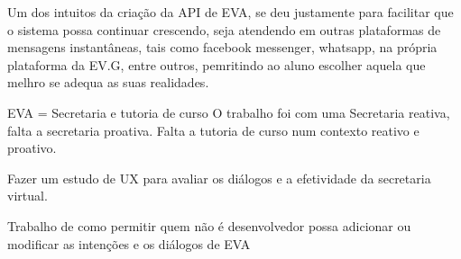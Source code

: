 Um dos intuitos da criação da API de EVA, se deu justamente para facilitar que o sistema possa continuar crescendo, seja atendendo em outras plataformas de mensagens instantâneas, tais como facebook messenger, whatsapp, na própria plataforma da EV.G, entre outros, pemritindo ao aluno escolher aquela que melhro se adequa as suas realidades.


EVA = Secretaria e tutoria de curso
O trabalho foi com uma Secretaria reativa, falta a secretaria proativa.
Falta a tutoria de curso num contexto reativo e proativo.

Fazer um estudo de UX para avaliar os diálogos e a efetividade da secretaria virtual.

Trabalho de como permitir quem não é desenvolvedor possa adicionar ou modificar as intenções e os diálogos de EVA
